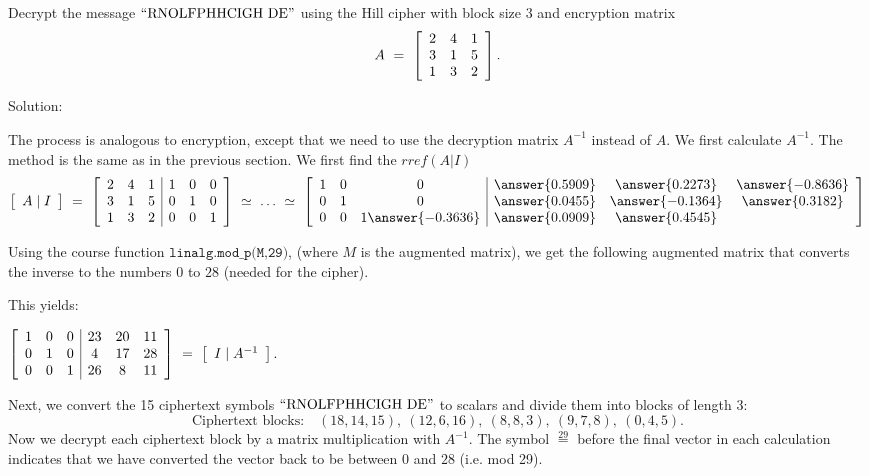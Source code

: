 \documentclass{ximera}
\begin{document}
\begin{example}\label{ex:hill-cipher-decryption}

  Decrypt the message $\q{RNOLFPHHCIGH DE}$ using the Hill cipher with
  block size $3$ and encryption matrix
  \begin{equation*}
    A ~=~ \startmat{ccc}
      2 & 4 & 1 \\
      3 & 1 & 5 \\
      1 & 3 & 2 \\
    \stopmat.
  \end{equation*}

  Solution:

  The process is analogous to encryption, except that we need to use
  the decryption matrix $A^{-1}$ instead of $A$. We first calculate
  $A^{-1}$.
  The method is the same as in the previous section. We first find the $rref(A|I)$
  \begin{equation*}
    \startmat{c}A\mid I\stopmat
    ~=~
    \startmat{ccc|ccc}
      2 & 4 & 1  &  1 & 0 & 0 \\
      3 & 1 & 5  &  0 & 1 & 0 \\
      1 & 3 & 2  &  0 & 0 & 1 \\
    \stopmat
    ~\simeq~\ldots~\simeq~
    \startmat{ccc|ccc}
    1 & 0 & 0  & \answer{0.5909} & \answer{0.2273} & \answer{-0.8636} \\
    0 & 1 & 0  &   \answer{0.0455} & \answer{-0.1364} & \answer{0.3182} \\
    0 & 0 & 1  \answer{-0.3636} & \answer{0.0909} & \answer{0.4545}
    \stopmat
  \end{equation*}

  Using the course function $\texttt{linalg.mod\_p(M,29)}$, (where $M$ is the augmented matrix), we get the following augmented matrix that converts the inverse to the numbers $0$ to $28$ (needed for the cipher).

  This yields:

  $\startmat{ccc|ccc}
      1 & 0 & 0  &  23 & 20 & 11 \\
      0 & 1 & 0  &   4 & 17 & 28 \\
      0 & 0 & 1  &  26 &  8 & 11 \\
    \stopmat
    ~=~
    \startmat{c}I\mid A^{-1}\stopmat.$

  Next, we convert the 15 ciphertext symbols $\q{RNOLFPHHCIGH DE}$ to
  scalars and divide them into blocks of length 3:
  \begin{equation*}
    \mbox{Ciphertext blocks:}\quad
    (18,14,15),\
    (12,6,16),\
    (8,8,3),\
    (9,7,8),\
    (0,4,5).
  \end{equation*}
  Now we decrypt each ciphertext block by a matrix multiplication
  with $A^{-1}$. The symbol $\stackrel{29}{=}$ before the final vector in each calculation indicates that we have converted the vector back to be between $0$ and $28$ (i.e. mod 29).


\end{example}
\end{document}
